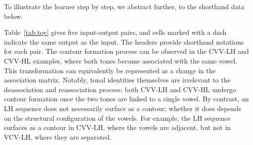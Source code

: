 To illustrate the learner step by step, we abstract further, to the
shorthand data below.

Table~\ref{tab.toy} gives five input-output pairs, and cells marked with
a dash indicate the same output as the input. The headers provide
shorthand notations for each pair. The contour formation process can be
observed in the CVV-LH and CVV-HL examples, where both tones become
associated with the same vowel. This transformation can equivalently be
represented as a change in the association matrix. Notably, tonal
identities themselves are irrelevant to the deassociation and
reassociation process: both CVV-LH and CVV-HL undergo contour formation
once the two tones are linked to a single vowel. By contrast, an LH
sequence does not necessarily surface as a contour; whether it does
depends on the structural configuration of the vowels. For example, the
LH sequence surfaces as a contour in CVV-LH, where the vowels are
adjacent, but not in VCV-LH, where they are separated.
